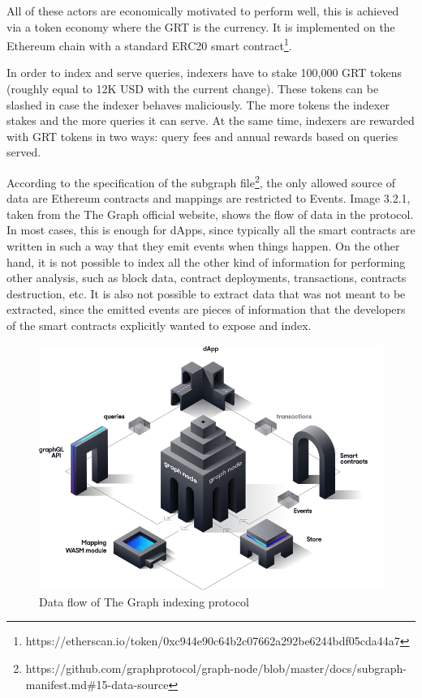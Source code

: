 All of these actors are economically motivated to perform well, this is achieved via a token economy where the GRT is the currency. It is implemented on the Ethereum chain with a standard ERC20 smart contract\footnote{https://etherscan.io/token/0xc944e90c64b2c07662a292be6244bdf05cda44a7}.

In order to index and serve queries, indexers have to stake 100,000 GRT tokens (roughly equal to 12K USD with the current change). These tokens can be slashed in case the indexer behaves maliciously. The more tokens the indexer stakes and the more queries it can serve. At the same time, indexers are rewarded with GRT tokens in two ways: query fees and annual rewards based on queries served.

According to the specification of the subgraph file\footnote{https://github.com/graphprotocol/graph-node/blob/master/docs/subgraph-manifest.md\#15-data-source}, the only allowed source of data are Ethereum contracts and mappings are restricted to Events. Image 3.2.1, taken from the The Graph official website, shows the flow of data in the protocol. In most cases, this is enough for dApps, since typically all the smart contracts are written in such a way that they emit events when things happen. On the other hand, it is not possible to index all the other kind of information for performing other analysis, such as block data, contract deployments, transactions, contracts destruction, etc. It is also not possible to extract data that was not meant to be extracted, since the emitted events are pieces of information that the developers of the smart contracts explicitly wanted to expose and index. 


\begin{figure}[H]
  \centering
  \includegraphics[width=1\textwidth]{Figures/graph-dataflow.png}
  \caption[The Graph data flow]{Data flow of The Graph indexing protocol}
  \label{fig:the-graph-data-flow}
\end{figure}

